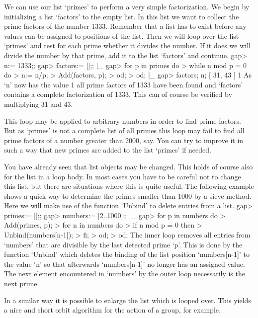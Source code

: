 We can use  our list `primes' to perform a very simple factorization.  We
begin by  initializing a list `factors' to the empty list.   In this list
we want to collect the prime factors of the number 1333.  Remember that a
list has to exist  before any values  can be assigned to positions of the
list.  Then we  will loop over the list `primes' and  test for each prime
whether it divides the  number.  If it does we will  divide the number by
that prime, add it to the list `factors' and continue.
\beginexample
    gap> n:= 1333;;
    gap> factors:= [];;
|_
    gap> for p in primes do
    >       while n mod p = 0 do
    >          n:= n/p;
    >          Add(factors, p);
    >       od;
    >    od;
|_
    gap> factors; n;
    [ 31, 43 ]
    1 
\endexample
As `n' now has the value 1 all prime factors  of 1333 have been found and
`factors' contains a complete factorization of  1333.  This can of course
be verified by multiplying 31 and 43.

This loop  may  be applied  to arbitrary  numbers in order  to find prime
factors.  But  as `primes' is not a complete list of all primes this loop
may fail  to find all prime factors of  a number greater than 2000,  say.
You  can try to improve it in such a way that new primes are added to the
list `primes' if needed.

You have already seen that list objects may be  changed.   This holds  of
course also for the  list in a loop body.  In most  cases  you have to be
careful not  to change this list, but there are situations  where this is
quite useful.  The following example  shows a quick way  to determine the
primes smaller than 1000 by a sieve method.  Here we will make use of the
function `Unbind' to delete entries from a list.
\beginexample
    gap> primes:= [];;
    gap> numbers:= [2..1000];;
|_
    gap> for p in numbers do
    >       Add(primes, p);
    >       for n in numbers do
    >          if n mod p = 0 then
    >             Unbind(numbers[n-1]);
    >          fi;
    >       od;
    >    od;
\endexample
The inner loop  removes all entries from `numbers' that are  divisible by
the last detected prime `p'.  This is done by the function `Unbind' which
deletes the binding of the list position  `numbers[n-1]' to the value `n'
so that afterwards `numbers[n-1]' no longer has  an  assigned value.  The
next  element encountered in `numbers'  by the outer  loop necessarily is
the next prime.

In a similar way it is possible to enlarge the list which is looped over.
This yields a nice and short orbit  algorithm for the  action of a group,
for example.

